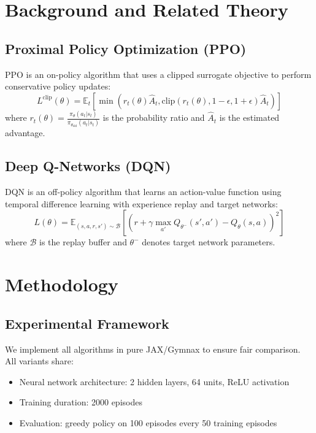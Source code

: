 \documentclass[conference]{IEEEtran}
\begin{document}
\section{Background and Related Theory}

\subsection{Proximal Policy Optimization (PPO)}
PPO is an on-policy algorithm that uses a clipped surrogate objective to perform conservative policy updates:
\begin{equation}
  L^{\text{clip}}(\theta) = \mathbb{E}_{t}\left[\min\left(r_t(\theta)\hat{A}_t, \text{clip}(r_t(\theta), 1-\epsilon, 1+\epsilon)\hat{A}_t\right)\right]
\end{equation}
where $r_t(\theta) = \frac{\pi_\theta(a_t|s_t)}{\pi_{\theta_{\text{old}}}(a_t|s_t)}$ is the probability ratio and $\hat{A}_t$ is the estimated advantage.

\subsection{Deep Q-Networks (DQN)}
DQN is an off-policy algorithm that learns an action-value function using temporal difference learning with experience replay and target networks:
\begin{equation}
  L(\theta) = \mathbb{E}_{(s,a,r,s')\sim\mathcal{B}}\left[\left(r + \gamma \max_{a'} Q_{\theta^-}(s', a') - Q_\theta(s, a)\right)^2\right]
\end{equation}
where $\mathcal{B}$ is the replay buffer and $\theta^-$ denotes target network parameters.

\section{Methodology}

\subsection{Experimental Framework}
We implement all algorithms in pure JAX/Gymnax to ensure fair comparison. All variants share:
\begin{itemize}
  \item Neural network architecture: 2 hidden layers, 64 units, ReLU activation
  \item Training duration: 2000 episodes
  \item Evaluation: greedy policy on 100 episodes every 50 training episodes
\end{itemize}
\end{document}
